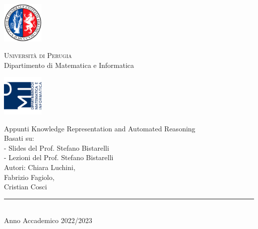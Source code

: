 
\thispagestyle{empty} %

\noindent %
\includegraphics[width=0.15\textwidth]{img/logoUniPg}
\begin{minipage}[b]{0.7\textwidth}
	\centering
	{\Large{\textsc{Universit{\`a} di Perugia}}}\\
	\vspace{0.4 em}
	{\large {Dipartimento di Matematica e Informatica}}
	\vspace{0.6 em}
\end{minipage}%
\includegraphics[width=0.15\textwidth]{img/logoDMI}

\vspace{8 em}

\begin{center}



	{\Huge{Appunti Knowledge Representation and Automated Reasoning }}\\
	\vspace{5 em}
	{\large {Basati su:}}\\
	{\large {- Slides del Prof. Stefano Bistarelli}}\\
	{\large {- Lezioni del Prof. Stefano Bistarelli}}\\
	\vspace{2 em}
	{\large {Autori: Chiara Luchini,}}\\
	{\large { Fabrizio Fagiolo,}}\\
	{\large { Cristian Cosci}}\\

	\vspace{6 em}
	\vfill

	{\rule{380pt}{.4pt}}\\
	\vspace{1.2 em}
	\large{{Anno Accademico 2022/2023}}




\end{center}

